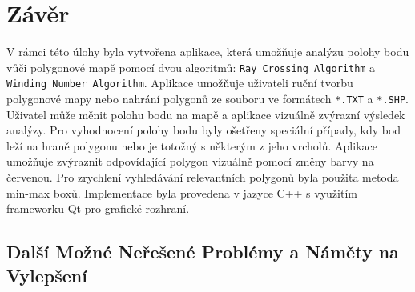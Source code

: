\section{Závěr}

V rámci této úlohy byla vytvořena aplikace, která umožňuje analýzu polohy bodu vůči polygonové mapě pomocí dvou algoritmů: \texttt{Ray Crossing Algorithm} a \texttt{Winding Number Algorithm}. Aplikace umožňuje uživateli ruční tvorbu polygonové mapy nebo nahrání polygonů ze souboru ve formátech \texttt{*.TXT} a \texttt{*.SHP}. Uživatel může měnit polohu bodu na mapě a aplikace vizuálně zvýrazní výsledek analýzy. Pro vyhodnocení polohy bodu byly ošetřeny speciální případy, kdy bod leží na hraně polygonu nebo je totožný s některým z jeho vrcholů. Aplikace umožňuje zvýraznit odpovídající polygon vizuálně pomocí změny barvy na červenou. Pro zrychlení vyhledávání relevantních polygonů byla použita metoda min-max boxů. Implementace byla provedena v jazyce C++ s využitím frameworku Qt pro grafické rozhraní.


\subsection{Další Možné Neřešené Problémy a Náměty na Vylepšení}

